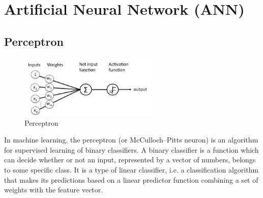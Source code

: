 \chapter{Artificial Neural Network (ANN)}

\section{Perceptron \cite{wiki-perceptron}}\label{perceptron}

\begin{figure}[H]
    \centering
    \includegraphics[height=3cm]{Pictures/deep_neural_networks/perceptron.jpg}
    \caption{Perceptron}
\end{figure}

In machine learning, the perceptron (or McCulloch–Pitts neuron) is an algorithm for supervised learning of binary classifiers. A binary classifier is a function which can decide whether or not an input, represented by a vector of numbers, belongs to some specific class. It is a type of linear classifier, i.e. a classification algorithm that makes its predictions based on a linear predictor function combining a set of weights with the feature vector.


